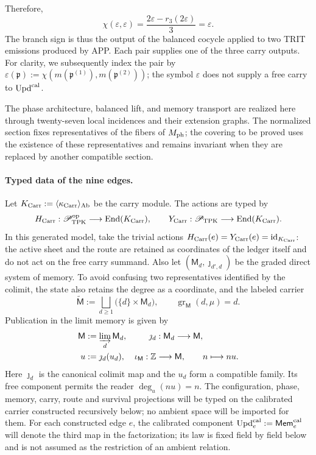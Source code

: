 Therefore,
\begin{equation}
 \chi(\varepsilon,\varepsilon)
 =\frac{2\varepsilon-r_3(2\varepsilon)}3=\varepsilon.
 \label{ix:eq:carry-no-parametrico-ch}
\end{equation}
The branch sign is thus the output of the balanced cocycle applied to two TRIT
emissions produced by APP. Each pair supplies one of the three carry outputs.
For clarity, we subsequently index the pair by
\(\varepsilon(\mathfrak p):=
\chi(m(\mathfrak p^{(1)}),m(\mathfrak p^{(2)}))\); the symbol
\(\varepsilon\) does not supply a free carry to \(\operatorname{Upd}^{\rm cal}\).

The phase architecture, balanced lift, and memory transport are realized here
through twenty-seven local incidences and their extension graphs. The
normalized section fixes representatives of the fibers of \(M_{\rm ph}\); the
covering to be proved uses the existence of these representatives and remains
invariant when they are replaced by another compatible section.

\paragraph{Typed data of the nine edges.}
Let \(K_{\rm Carr}:=\langle\kappa_{\rm Carr}\rangle_{\rm Ab}\) be the carry
module. The actions are typed by
\[
 H_{\rm Carr}:\mathscr P_{\rm TPK}^{\rm op}
   \longrightarrow\operatorname{End}(K_{\rm Carr}),\qquad
 Y_{\rm Carr}:\mathscr P_{\rm TPK}
   \longrightarrow\operatorname{End}(K_{\rm Carr}).
\]
In this generated model, take the trivial actions
\(H_{\rm Carr}(e)=Y_{\rm Carr}(e)=\operatorname{id}_{K_{\rm Carr}}\): the
active sheet and the route are retained as coordinates of the ledger itself
and do not act on the free carry summand. Also let
\((\mathsf M_d,\jmath_{d',d})\) be the graded direct system of memory. To
avoid confusing two representatives identified by the colimit, the state also
retains the degree as a coordinate, and the labeled carrier
\[
 \widetilde{\mathsf M}:=
 \bigsqcup_{d\ge1}\bigl(\{d\}\times\mathsf M_d\bigr),
 \qquad
 \operatorname{gr}_{\mathsf M}(d,\mu)=d.
\]
Publication in the limit memory is given by
\[
\begin{aligned}
 \mathsf M&:=\varinjlim_d\mathsf M_d,&
 \jmath_d&:\mathsf M_d\longrightarrow\mathsf M,\\
 u&:=\jmath_d(u_d),&
 \iota_{\mathsf M}:\mathbb Z&\longrightarrow\mathsf M,
 \qquad n\longmapsto nu .
\end{aligned}
\]
Here \(\jmath_d\) is the canonical colimit map and the \(u_d\) form a
compatible family. Its free component permits
the reader \(\deg_u(nu)=n\).
The configuration, phase, memory, carry, route and
survival projections will be typed on the calibrated carrier constructed
recursively below; no ambient space will be imported for them.
For each constructed edge \(e\), the
calibrated component
\(\operatorname{Upd}^{\rm cal}_e:=\mathsf{Mem}^{\rm cal}_e\) will denote the
third map in the factorization; its law is fixed field by field
below and is not assumed as the restriction of an ambient relation.

